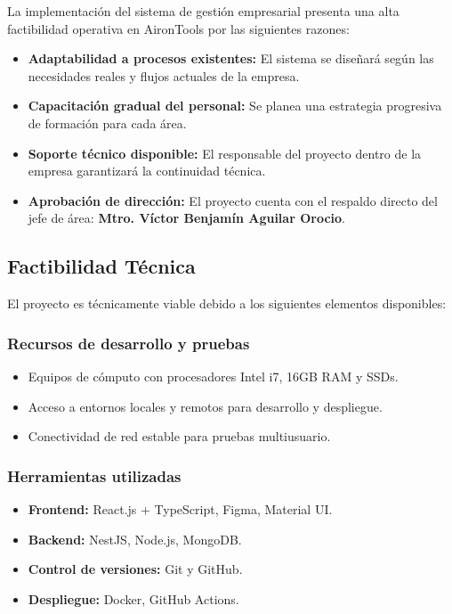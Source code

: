 La implementación del sistema de gestión empresarial presenta una alta factibilidad operativa en AironTools por las siguientes razones:

\begin{itemize}
	\item \textbf{Adaptabilidad a procesos existentes:} El sistema se diseñará según las necesidades reales y flujos actuales de la empresa.
	\item \textbf{Capacitación gradual del personal:} Se planea una estrategia progresiva de formación para cada área.
	\item \textbf{Soporte técnico disponible:} El responsable del proyecto dentro de la empresa garantizará la continuidad técnica.
	\item \textbf{Aprobación de dirección:} El proyecto cuenta con el respaldo directo del jefe de área: \textbf{Mtro. Víctor Benjamín Aguilar Orocio}.
\end{itemize}

\subsection{Factibilidad Técnica}

El proyecto es técnicamente viable debido a los siguientes elementos disponibles:

\subsubsection{Recursos de desarrollo y pruebas}
\begin{itemize}
	\item Equipos de cómputo con procesadores Intel i7, 16GB RAM y SSDs.
	\item Acceso a entornos locales y remotos para desarrollo y despliegue.
	\item Conectividad de red estable para pruebas multiusuario.
\end{itemize}

\subsubsection{Herramientas utilizadas}
\begin{itemize}
	\item \textbf{Frontend:} React.js + TypeScript, Figma, Material UI.
	\item \textbf{Backend:} NestJS, Node.js, MongoDB.
	\item \textbf{Control de versiones:} Git y GitHub.
	\item \textbf{Despliegue:} Docker, GitHub Actions.
\end{itemize}

